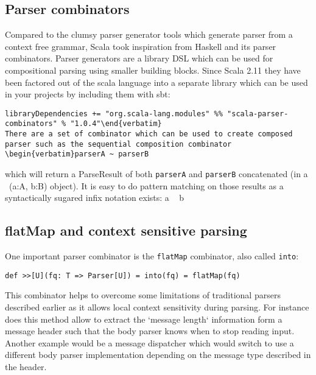 \subsection{Parser combinators}
Compared to the clumsy parser generator tools which generate parser from a context free grammar, Scala took inspiration from Haskell and its parser combinators. Parser generators are a library DSL which can be used for compositional parsing using smaller building blocks.
Since Scala 2.11 they have been factored out of the scala language into a separate library which can be used in your projects by including them with sbt:
\begin{verbatim}libraryDependencies += "org.scala-lang.modules" %% "scala-parser-combinators" % "1.0.4"\end{verbatim}
There are a set of combinator which can be used to create composed parser such as the sequential composition combinator \begin{verbatim}parserA ~ parserB\end{verbatim} which will return a ParseResult of both \verb/parserA/ and \verb/parserB/ concatenated (in a ~(a:A, b:B) object). It is easy to do pattern matching on those results as a syntactically sugared infix notation exists: a ~ b

\subsection{flatMap and context sensitive parsing}
One important parser combinator is the \verb/flatMap/ combinator, also called \verb/into/:
\begin{verbatim}def >>[U](fq: T => Parser[U]) = into(fq) = flatMap(fq)\end{verbatim}
This combinator helps to overcome some limitations of traditional parsers described earlier as it allows local context sensitivity during parsing. For instance does this method allow to extract the `message length` information form a message header such that the body parser knows when to stop reading input. Another example would be a message dispatcher which would switch to use a different body parser implementation depending on the message type described in the header.
